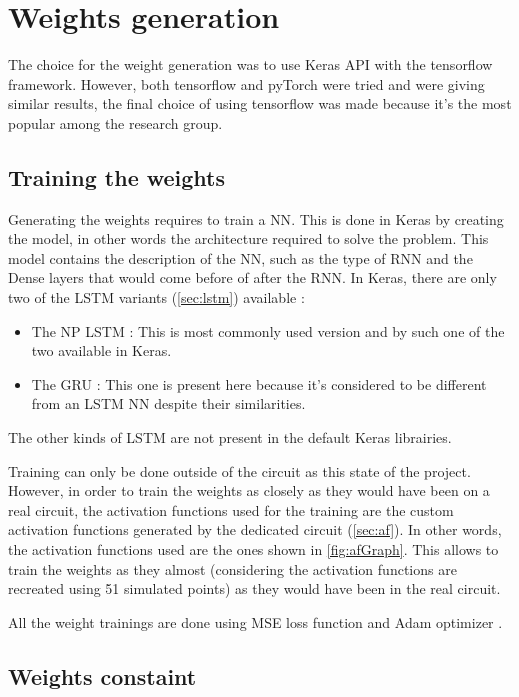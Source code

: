 \section{Weights generation}
\label{sec:genwei}

The choice for the weight generation was to use Keras API with the tensorflow framework. However, both tensorflow and pyTorch were tried and were giving similar results, the final choice of using tensorflow was made because it's the most popular among the research group.%

\subsection{Training the weights}

Generating the weights requires to train a \ac{NN}. This is done in Keras by creating the model, in other words the architecture required to solve the problem. This model contains the description of the \ac{NN}, such as the type of \ac{RNN} and the Dense layers that would come before of after the \ac{RNN}. In Keras, there are only two of the \ac{LSTM} variants (\cref{sec:lstm}) available :

\begin{itemize}
  \item The \ac{NP} \ac{LSTM} : This is most commonly used version and by such one of the two available in Keras.
  \item The \ac{GRU} : This one is present here because it's considered to be different from an \ac{LSTM} \ac{NN} despite their similarities.
\end{itemize}

The other kinds of \ac{LSTM} are not present in the default Keras librairies.

Training can only be done outside of the circuit as this state of the project. However, in order to train the weights as closely as they would have been on a real circuit, the activation functions used for the training are the custom activation functions generated by the dedicated circuit (\cref{sec:af}). In other words, the activation functions used are the ones shown in \cref{fig:afGraph}. This allows to train the weights as they almost (considering the activation functions are recreated using 51 simulated points) as they would have been in the real circuit.

All the weight trainings are done using \ac{MSE} loss function and Adam optimizer \cite{adamOpti}.

\subsection{Weights constaint}

